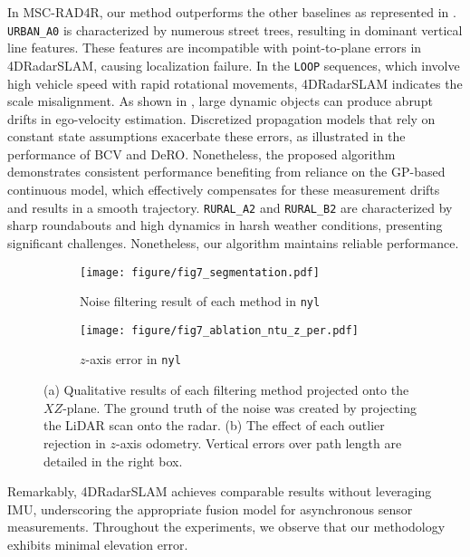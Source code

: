 In MSC-RAD4R, our method outperforms the other baselines as represented in .
\texttt{URBAN\_A0} is characterized by numerous street trees, resulting in dominant vertical line features. These features are incompatible with point-to-plane errors in 4DRadarSLAM, causing localization failure.
In the \texttt{LOOP} sequences, which involve high vehicle speed with rapid rotational movements, 4DRadarSLAM indicates the scale misalignment.
As shown in , large dynamic objects can produce abrupt drifts in ego-velocity estimation. Discretized propagation models that rely on constant state assumptions exacerbate these errors, as illustrated in the performance of BCV and DeRO.
Nonetheless, the proposed algorithm demonstrates consistent performance benefiting from reliance on the \ac{GP}-based continuous model, which effectively compensates for these measurement drifts and results in a smooth trajectory.
\texttt{RURAL\_A2} and \texttt{RURAL\_B2} are characterized by sharp roundabouts and high dynamics in harsh weather conditions, presenting significant challenges. Nonetheless, our algorithm maintains reliable performance.
\begin{figure*}[!t]
    \centering
    \begin{subfigure}[b]{0.51\textwidth}
        \centering
        \texttt{[image: figure/fig7\_segmentation.pdf]}
        \vspace{-6mm}
        \caption{Noise filtering result of each method in \texttt{nyl}}
        \label{subfig:filter}
    \end{subfigure}
    \hspace{-2mm}
    \begin{subfigure}[b]{0.48\textwidth}
        \centering
        \texttt{[image: figure/fig7\_ablation\_ntu\_z\_per.pdf]}
        \vspace{-6mm}
        \caption{$z$-axis error in \texttt{nyl}}
        \label{subfig:elevation}
    \end{subfigure}
    \caption{(a) Qualitative results of each filtering method projected onto the $XZ$-plane.
    The ground truth of the noise was created by projecting the \ac{LiDAR} scan onto the radar. (b) The effect of each outlier rejection in $z$-axis odometry. Vertical errors over path length are detailed in the right box.}
    \label{fig:elevation}
    \vspace{-6mm}
\end{figure*}
Remarkably, 4DRadarSLAM achieves comparable results without leveraging \ac{IMU}, underscoring the appropriate fusion model for asynchronous sensor measurements.
Throughout the experiments, we observe that our methodology exhibits minimal elevation error.

